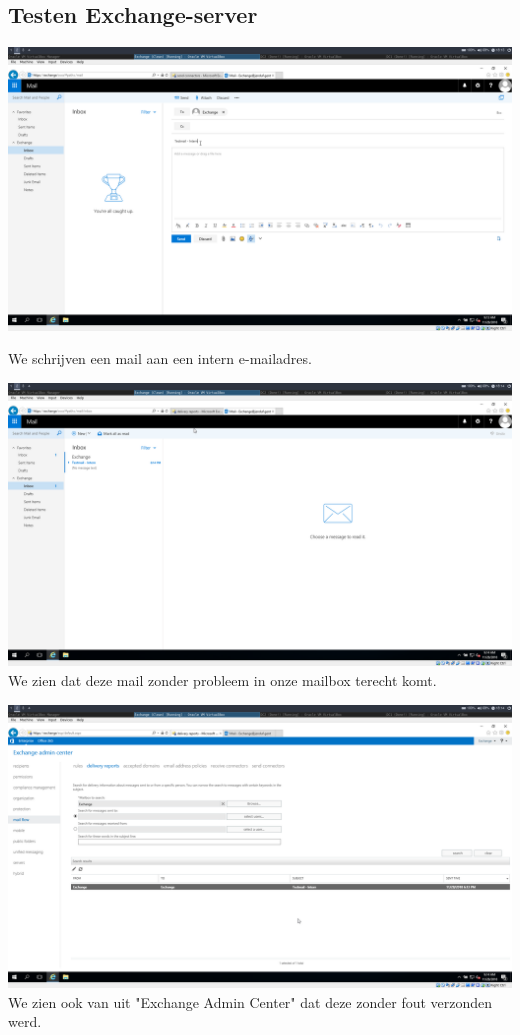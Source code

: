 \documentclass[a4paper]{article}
\begin{document}
\subsection{Testen Exchange-server}
\begin{center}
	\includegraphics[width=15cm]{Pictures/Exchange/test/1543425223.png}
	
	We schrijven een mail aan een intern e-mailadres.
\end{center}
\begin{center}
	\includegraphics[width=15cm]{Pictures/Exchange/test/1543425279.png}
	We zien dat deze mail zonder probleem in onze mailbox terecht komt.
\end{center}
\begin{center}
	\includegraphics[width=15cm]{Pictures/Exchange/test/1543425292.png}
	We zien ook van uit "Exchange Admin Center" dat deze zonder fout verzonden werd.
\end{center}
\end{document}
